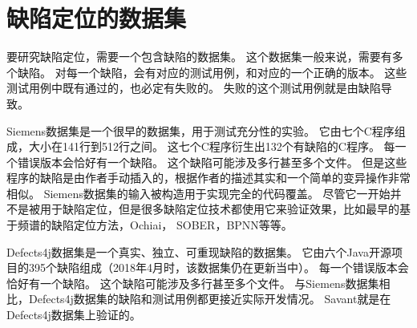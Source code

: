 \section{缺陷定位的数据集}

要研究缺陷定位，需要一个包含缺陷的数据集。
这个数据集一般来说，需要有多个缺陷。
对每一个缺陷，会有对应的测试用例，和对应的一个正确的版本。
这些测试用例中既有通过的，也必定有失败的。
失败的这个测试用例就是由缺陷导致。

Siemens数据集\parencite{Hutchins1994Experiments}是一个很早的数据集，用于测试充分性的实验。
它由七个C程序组成，大小在141行到512行之间。
这七个C程序衍生出132个有缺陷的C程序。
每一个错误版本会恰好有一个缺陷。
这个缺陷可能涉及多行甚至多个文件。
但是这些程序的缺陷是由作者手动插入的，根据作者的描述其实和一个简单的变异操作非常相似。
Siemens数据集的输入被构造用于实现完全的代码覆盖。
尽管它一开始并不是被用于缺陷定位，但是很多缺陷定位技术都使用它来验证效果，比如最早的基于频谱的缺陷定位方法\parencite{Renieres2003Fault}，Ochiai\parencite{Abreu2006An,Abreu2007On}，
SOBER\parencite{Liu2006Statistical}，BPNN\parencite{W2009BP}等等。

Defects4j数据集\parencite{Just2014Defects4J}是一个真实、独立、可重现缺陷的数据集。
它由六个Java开源项目的395个缺陷组成（2018年4月时，该数据集仍在更新当中）。
每一个错误版本会恰好有一个缺陷。
这个缺陷可能涉及多行甚至多个文件。
与Siemens数据集相比，Defects4j数据集的缺陷和测试用例都更接近实际开发情况。
Savant\parencite{Le2016A}就是在Defects4j数据集上验证的。
